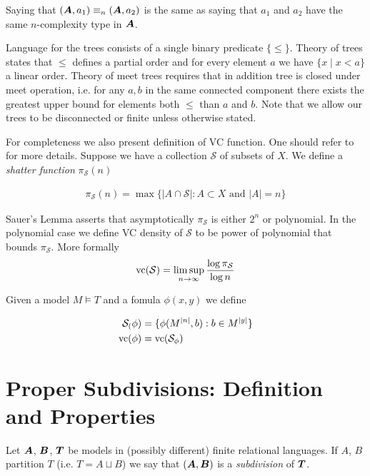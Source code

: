 \documentclass{amsart}
\DeclareMathOperator{\TT}{\boldface T}
\DeclareMathOperator{\A}{\boldface A}
\DeclareMathOperator{\B}{\boldface B}
\newcommand{\CS}{\mathcal S}
\begin{document}
\begin{Note}
	Saying that $(\A, a_1) \equiv_n (\A, a_2)$ is the same as saying that $a_1$ and $a_2$ have the same $n$-complexity type in $\A$.
\end{Note}

Language for the trees consists of a single binary predicate $\{\leq\}$. Theory of trees states that $\leq$ defines a partial order and for every element $a$ we have $\{x \mid x < a\}$ a linear order. Theory of meet trees requires that in addition tree is closed under meet operation, i.e. for any $a, b$ in the same connected component there exists the greatest upper bound for elements both $\leq$ than $a$ and $b$. Note that we allow our trees to be disconnected or finite unless otherwise stated.

For completeness we also present definition of VC function.
One should refer to \cite{vc_density} for more details.
Suppose we have a collection $\CS$ of subsets of $X$. We define a \emph{shatter function} $\pi_\CS(n)$

\begin{align*}
	\pi_\CS(n) = \max \{|A \cap \CS| : A \subset X \text{ and } |A| = n\}
\end{align*}

Sauer's Lemma asserts that asymptotically $\pi_\CS$ is either $2^n$ or polynomial.
In the polynomial case we define VC density of $\CS$ to be power of polynomial that bounds $\pi_\CS$.
More formally 
\begin{align*}
	\vc(\CS) = \limsup_{n \to \infty}\frac{\log \pi_\CS}{\log n}
\end{align*}

Given a model $M \models T$ and a fomula $\phi(x, y)$ we define 

\begin{align*}
	\CS_(\phi) &= \{\phi(M^{|n|}, b) : b \in M^{|y|}\} \\
	\vc(\phi) &=  \vc(\CS_\phi)
\end{align*}

\section{Proper Subdivisions: Definition and Properties}

\begin{Definition}
	Let $\A$, $\B$, $\TT$ be models in (possibly different) finite relational languages. If $A$, $B$ partition $T$ (i.e. $T = A \sqcup B$) we say that $(\A, \B)$ is a \emph{subdivision} of $\TT$.
\end{Definition}
\end{document}
